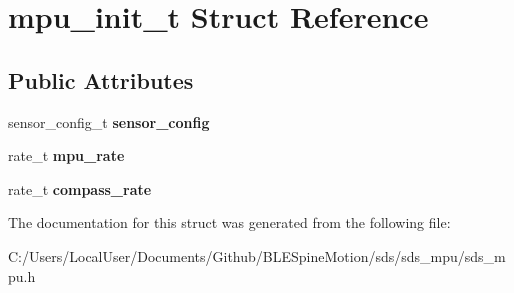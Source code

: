 \hypertarget{structmpu__init__t}{}\section{mpu\+\_\+init\+\_\+t Struct Reference}
\label{structmpu__init__t}
\subsection*{Public Attributes}
\begin{DoxyCompactItemize}
\item 
\mbox{\label{structmpu__init__t_a0c6e13b8066fe0531f90af87beef6375}} 
sensor\+\_\+config\+\_\+t {\bfseries sensor\+\_\+config}
\item 
\mbox{\label{structmpu__init__t_aded5ff1e7bc8c5f45cfaf345e99e4148}} 
rate\+\_\+t {\bfseries mpu\+\_\+rate}
\item 
\mbox{\label{structmpu__init__t_a5f1154b594bf6f480fdb4d41e343faf9}} 
rate\+\_\+t {\bfseries compass\+\_\+rate}
\end{DoxyCompactItemize}


The documentation for this struct was generated from the following file\+:\begin{DoxyCompactItemize}
\item 
C\+:/\+Users/\+Local\+User/\+Documents/\+Github/\+B\+L\+E\+Spine\+Motion/sds/sds\+\_\+mpu/sds\+\_\+mpu.\+h\end{DoxyCompactItemize}
